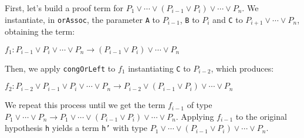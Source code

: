 
First, let's build a proof term for $P_{1} \vee \cdots \vee (P_{i - 1} \vee P_{i}) \vee \cdots \vee P_{n}$. We instantiate, in \texttt{orAssoc}, the parameter \texttt{A} to $P_{i - 1}$, \texttt{B} to $P_{i}$ and \texttt{C} to $P_{i + 1} \vee \cdots \vee P_{n}$, obtaining the term:

\begin{center}
    $f_{1}: P_{i - 1} \vee P_{i} \vee \cdots \vee P_{n}   \rightarrow (P_{i - 1} \vee P_{i}) \vee \cdots \vee P_{n} $
\end{center}

Then, we apply \texttt{congOrLeft} to $f_{1}$ instantiating \texttt{C} to $P_{i - 2}$, which produces:

\begin{center}
    $f_{2}: P_{i - 2} \vee P_{i - 1} \vee P_{i} \vee \cdots \vee P_{n}   \rightarrow P_{i - 2} \vee (P_{i - 1} \vee P_{i}) \vee \cdots \vee P_{n} $
\end{center}

We repeat this process until we get the term $f_{i - 1}$ of type $P_{1} \vee \cdots \vee P_{n} \rightarrow P_{1} \vee \cdots \vee (P_{i - 1} \vee P_{i}) \vee \cdots \vee P_{n}$. Applying $f_{i - 1}$ to the original hypothesis \texttt{h} yields a term \texttt{h'} with type $P_{1} \vee \cdots \vee (P_{i - 1} \vee P_{i}) \vee \cdots \vee P_{n}$.

